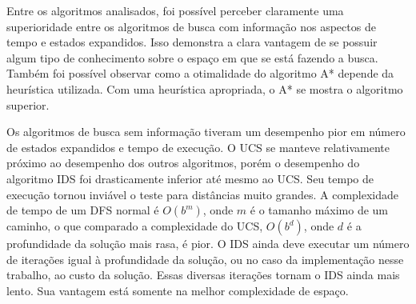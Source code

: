 Entre os algoritmos analisados, foi possível perceber claramente uma superioridade entre os algoritmos de busca com informação nos aspectos de tempo e estados expandidos. Isso demonstra a clara vantagem de se possuir algum tipo de conhecimento sobre o espaço em que se está fazendo a busca. Também foi possível observar como a otimalidade do algoritmo A* depende da heurística utilizada. Com uma heurística apropriada, o A* se mostra o algoritmo superior.

Os algoritmos de busca sem informação tiveram um desempenho pior em número de estados expandidos e tempo de execução. O UCS se manteve relativamente próximo ao desempenho dos outros algoritmos, porém o desempenho do algoritmo IDS foi drasticamente inferior até mesmo ao UCS. Seu tempo de execução tornou inviável o teste para distâncias muito grandes. A complexidade de tempo de um DFS normal é $O(b^m)$, onde $m$ é o tamanho máximo de um caminho, o que comparado a complexidade do UCS, $O(b^d)$, onde $d$ é a profundidade da solução mais rasa, é pior. O IDS ainda deve executar um número de iterações igual à profundidade da solução, ou no caso da implementação nesse trabalho, ao custo da solução. Essas diversas iterações tornam o IDS ainda mais lento. Sua vantagem está somente na melhor complexidade de espaço.